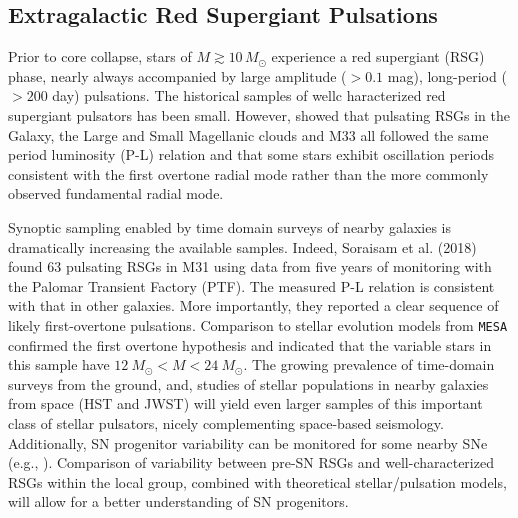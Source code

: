 \subsection{Extragalactic Red Supergiant Pulsations}

Prior to core collapse, stars of $M \! \gtrsim \! 10 \, M_\odot$ experience a red
supergiant (RSG) phase, nearly always accompanied by large amplitude
($>0.1$ mag), long-period ($>200 $ day) pulsations.  
The historical samples of wellc haracterized red supergiant pulsators has been small. However, \citet{Yang_2012} showed that pulsating RSGs in the Galaxy, the Large and Small Magellanic clouds and M33 all followed the
same period luminosity (P-L) relation and that some stars exhibit
oscillation periods consistent with the first overtone radial mode
rather than the more commonly observed fundamental radial mode. 

Synoptic sampling enabled by time domain surveys of
nearby galaxies is dramatically increasing the available samples. Indeed, Soraisam et al. (2018) found 63 pulsating RSGs in M31 using data from five years of
monitoring with the Palomar Transient Factory (PTF). The measured P-L
relation is consistent with that in other galaxies. 
{\color{green} More importantly, they reported a clear sequence of likely first-overtone
pulsations. Comparison to stellar evolution models from \texttt{MESA}
confirmed the first overtone hypothesis and indicated that} the
variable stars in this sample have $12~M_{\odot} \! < \! M \! < \! 24~M_{\odot}$. The growing prevalence of time-domain surveys from the ground, and, studies 
of stellar populations in nearby galaxies from space (HST and JWST) 
will yield even larger samples of this important class of stellar pulsators, nicely complementing space-based seismology. Additionally, SN progenitor variability can be monitored for some nearby SNe (e.g., \citealt{kochanek:17}). Comparison of variability between pre-SN RSGs and well-characterized RSGs within the local group, combined with theoretical stellar/pulsation models, will allow for a better understanding of SN progenitors.